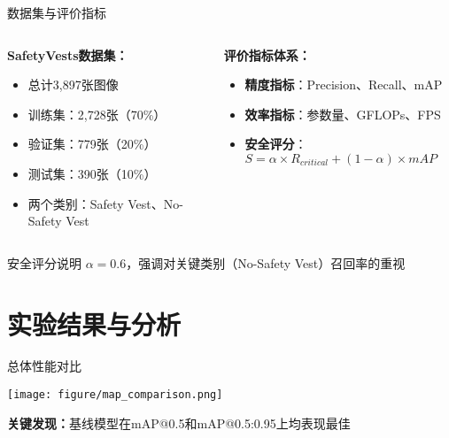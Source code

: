\documentclass[aspectratio=169]{beamer}
\begin{document}
\begin{frame}{数据集与评价指标}
    \begin{columns}
        \begin{column}{0.5\textwidth}
            \textbf{SafetyVests数据集：}
            \begin{itemize}
                \item 总计3,897张图像
                \item 训练集：2,728张（70\%）
                \item 验证集：779张（20\%）
                \item 测试集：390张（10\%）
                \item 两个类别：Safety Vest、No-Safety Vest
            \end{itemize}
        \end{column}
        \begin{column}{0.5\textwidth}
            \textbf{评价指标体系：}
            \begin{itemize}
                \item \textbf{精度指标}：Precision、Recall、mAP
                \item \textbf{效率指标}：参数量、GFLOPs、FPS
                \item \textbf{安全评分}：$S = \alpha \times R_{critical} + (1-\alpha) \times mAP$
            \end{itemize}
        \end{column}
    \end{columns}
    
    \begin{alertblock}{安全评分说明}
        $\alpha = 0.6$，强调对关键类别（No-Safety Vest）召回率的重视
    \end{alertblock}
\end{frame}

\section{实验结果与分析}

\begin{frame}{总体性能对比}
    \begin{center}
        \texttt{[image: figure/map\_comparison.png]}
    \end{center}
    
    \textbf{关键发现：}基线模型在mAP@0.5和mAP@0.5:0.95上均表现最佳
\end{frame}
\end{document}
